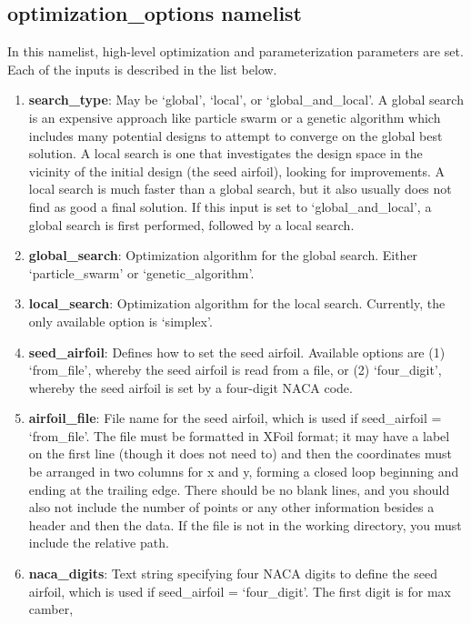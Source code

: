 \documentclass[11pt]{article}
\begin{document}
\subsection{optimization\_options namelist}

In this namelist, high-level optimization and parameterization parameters are set.  Each
of the inputs is described in the list below.

\begin{enumerate}
\item{\textbf{search\_type}: May be `global', `local', or `global\_and\_local'.
A global search is an expensive approach like particle swarm or a genetic algorithm which
includes many potential designs to attempt to converge on the global best solution.  A
local search is one that investigates the design space in the vicinity of the initial
design (the seed airfoil), looking for improvements.  A local search is much faster than
a global search, but it also usually does not find as good a final solution.  If this
input is set to `global\_and\_local', a global search is first performed, followed by a
local search.}
\item{\textbf{global\_search}: Optimization algorithm for the global search.  Either
`particle\_swarm' or `genetic\_algorithm'.}
\item{\textbf{local\_search}: Optimization algorithm for the local search.  Currently, the
only available option is `simplex'.}
\item{\textbf{seed\_airfoil}: Defines how to set the seed airfoil.  Available options are
(1) `from\_file', whereby the seed airfoil is read from a file, or (2) `four\_digit',
whereby the seed airfoil is set by a four-digit NACA code.}
\item{\textbf{airfoil\_file}: File name for the seed airfoil, which is used if
seed\_airfoil = `from\_file'.  The file must be formatted in XFoil format; it may have a
label on the first line (though it does not need to) and then the coordinates must be
arranged in two columns for x and y, forming a closed loop beginning and ending at the
trailing edge. There should be no blank lines, and you should also not include the number
of points or any other information besides a header and then the data.  If the file is not 
in the working directory, you must include the relative path.}
\item{\textbf{naca\_digits}: Text string specifying four NACA digits to define the seed
airfoil, which is used if seed\_airfoil = `four\_digit'.  The first digit is for max camber,
}
\end{enumerate}
\end{document}
